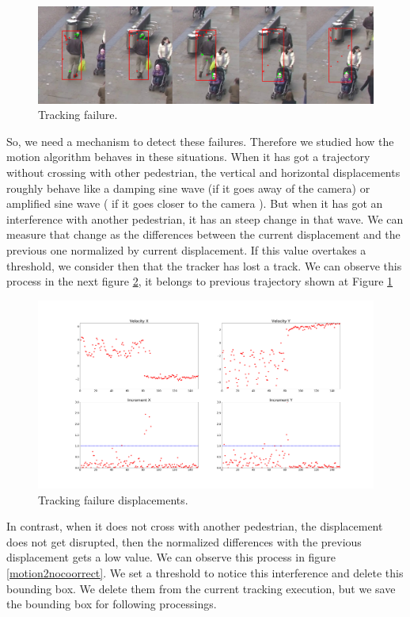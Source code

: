 \begin{figure}[H]
\centering         
\includegraphics[width=0.9\linewidth]{velocidadas/mateuPont.png}
\caption{Tracking failure.} \label{traccs}
\end{figure}


So, we need a mechanism to detect these failures. Therefore we studied how the motion algorithm behaves in these situations. When it has got a trajectory without crossing with other pedestrian, the vertical and horizontal displacements roughly behave like a damping sine wave (if it goes away of the camera)  or amplified sine wave ( if it goes closer to the camera ). But when it has got an interference with another pedestrian, it has an steep change in that wave. We can measure that change as the differences between the current displacement and the previous one normalized by current displacement. If this value overtakes a threshold, we consider then that the tracker has lost a track. We can observe this process in the next figure \ref{traccs23}, it belongs to previous trajectory shown at Figure \ref{traccs} 


\begin{figure}[H]
\centering         
\includegraphics[width=0.9\linewidth]{velocidadas/bad_threshold.png}
\caption{Tracking failure displacements.} \label{traccs23}
\end{figure}


In contrast, when it does not cross with another pedestrian, the displacement does not get disrupted, then the normalized differences with the previous displacement gets a low value. We can observe this process in figure \ref{motion2nocoorrect}. We set a threshold to notice this interference and delete this bounding box. We delete them from the current tracking execution, but we save the bounding box for following processings.


